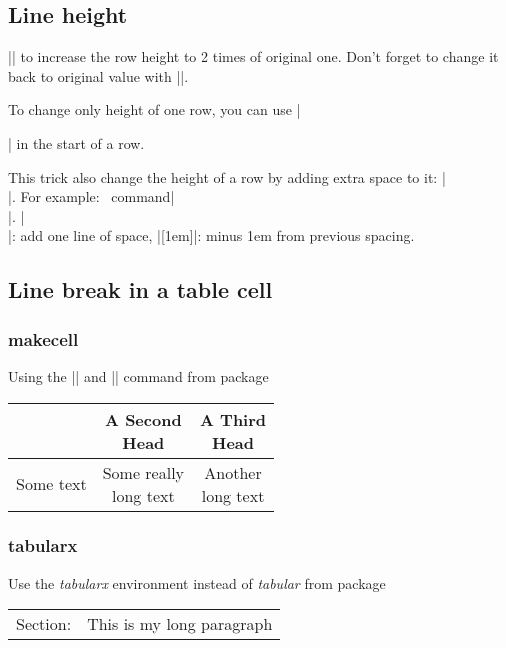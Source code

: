 \subsection{Line height}
\command|\renewcommand{\arraystretch}{2}| to increase the row height to 
2 times of original one. Don't forget to change it back to original value
with \command|\renewcommand{\arraystretch}{1}|. 

To change only height of one row, you can use \command|\rule{0pt}{height} | in the start of a row. 

This trick also change the height of a row by adding extra space to it: 
\command|\\[distance]|. For example: |\\[-1em]|. \command|\\|: add one line of space, 
\command|[\-1em]|: minus 1em from previous spacing.

\subsection{Line break in a table cell}

\subsubsection{makecell}
Using the \command|\thead| and \command|\makecell| command from package 

\renewcommand\theadalign{bc}
\renewcommand\theadfont{\bfseries}
\renewcommand\theadgape{\Gape[4pt]}
\renewcommand\cellgape{\Gape[4pt]}

\begin{center}
    \begin{tabular}{ | c | c | c |}
	\hline
	\thead{A Head}	& \thead{A Second \\ Head}  & \thead{A Third \\ Head}	\\
	\hline
	Some text   & \makecell{Some really \\ long text}   & \makecell{Another \\ long text}	\\
	\hline
    \end{tabular}
\end{center}

\subsubsection{tabularx}
Use the \emph{tabularx} environment instead of \emph{tabular} from package 
\begin{center}
    \begin{tabularx}{\textwidth}{lX}
	Section:    & This is my \newline 
		      long paragraph	\\
    \end{tabularx}
\end{center}


